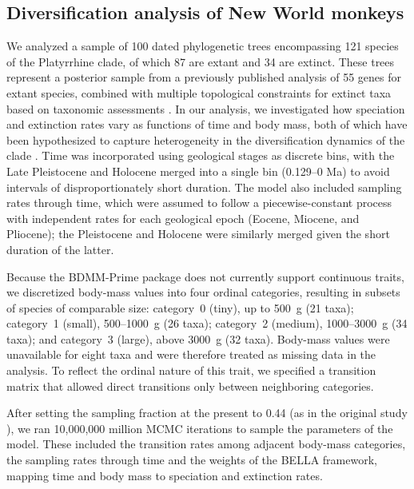 \subsection{Diversification analysis of New World monkeys}

We analyzed a sample of 100 dated phylogenetic trees encompassing 121 species of the Platyrrhine clade, of which 87 are extant and 34 are extinct.
These trees represent a posterior sample from a previously published analysis of 55 genes for extant species, combined with multiple topological constraints for extinct taxa based on taxonomic assessments \citep{silvestro2019early}.
In our analysis, we investigated how speciation and extinction rates vary as functions of time and body mass, both of which have been hypothesized to capture heterogeneity in the diversification dynamics of the clade \citep{aristide2015modeling,silvestro2019early}.
Time was incorporated using geological stages as discrete bins, with the Late Pleistocene and Holocene merged into a single bin (0.129--0 Ma) to avoid intervals of disproportionately short duration.
The model also included sampling rates through time, which were assumed to follow a piecewise-constant process with independent rates for each geological epoch (Eocene, Miocene, and Pliocene); the Pleistocene and Holocene were similarly merged given the short duration of the latter.

Because the BDMM-Prime package \citep{Vaughan2025BDMM} does not currently support continuous traits, we discretized body-mass values into four ordinal categories, resulting in subsets of species of comparable size:
category~0 (tiny), up to 500~g (21 taxa);
category~1 (small), 500--1000~g (26 taxa);
category~2 (medium), 1000--3000~g (34 taxa); and
category~3 (large), above 3000~g (32 taxa).
Body-mass values were unavailable for eight taxa and were therefore treated as missing data in the analysis.
To reflect the ordinal nature of this trait, we specified a transition matrix that allowed direct transitions only between neighboring categories.

After setting the sampling fraction at the present to 0.44 (as in the original study \citep{silvestro2019early}), we ran 10,000,000 million MCMC iterations to sample the parameters of the model.
These included the transition rates among adjacent body-mass categories, the sampling rates through time and the weights of the BELLA framework, mapping time and body mass to speciation and extinction rates.

